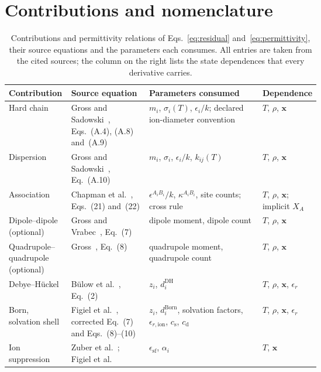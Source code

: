 \section{Contributions and nomenclature}
\begin{table}[pos=htbp]
\centering
\caption{Contributions and permittivity relations of Eqs.~\eqref{eq:residual} and~\eqref{eq:permittivity}, their source equations and the parameters each consumes. All entries are taken from the cited sources; the column on the right lists the state dependences that every derivative carries.}
\label{tab:contributions}
\small
\begin{tabularx}{\linewidth}{@{}>{\raggedright\arraybackslash}p{0.2\linewidth}>{\raggedright\arraybackslash}p{0.25\linewidth}>{\raggedright\arraybackslash}X>{\raggedright\arraybackslash}p{0.17\linewidth}@{}}
\toprule
Contribution & Source equation & Parameters consumed & Dependence \\
\midrule
Hard chain & Gross and Sadowski~\citep{Gross2001}, Eqs.~(A.4), (A.8) and~(A.9) & $m_i$, $\sigma_i(T)$, $\epsilon_i/k$; declared ion-diameter convention & $T$, $\rho$, $\mathbf{x}$ \\
Dispersion & Gross and Sadowski~\citep{Gross2001}, Eq.~(A.10) & $m_i$, $\sigma_i$, $\epsilon_i/k$, $k_{ij}(T)$ & $T$, $\rho$, $\mathbf{x}$ \\
Association & Chapman et al.~\citep{Chapman1990}, Eqs.~(21) and~(22) & $\epsilon^{A_iB_i}/k$, $\kappa^{A_iB_i}$, site counts; cross rule & $T$, $\rho$, $\mathbf{x}$; implicit $X_A$ \\
Dipole--dipole (optional) & Gross and Vrabec~\citep{Gross2006}, Eq.~(7) & dipole moment, dipole count & $T$, $\rho$, $\mathbf{x}$ \\
Quadrupole--quadrupole (optional) & Gross~\citep{grossEquationofstateContributionPolar2005}, Eq.~(8) & quadrupole moment, quadrupole count & $T$, $\rho$, $\mathbf{x}$ \\
Debye--H\"uckel & B\"ulow et al.~\citep{Bulow2019}, Eq.~(2) & $z_i$, $d_i^{\mathrm{DH}}$ & $T$, $\rho$, $\mathbf{x}$, $\epsilon_r$ \\
Born, solvation shell & Figiel et al.~\citep{Figiel2025,Figiel2026Correction}, corrected Eq.~(7) and Eqs.~(8)--(10) & $z_i$, $d_i^{\mathrm{Born}}$, solvation factors, $\epsilon_{r,\mathrm{ion}}$, $c_{\mathrm{s}}$, $c_{\mathrm{d}}$ & $T$, $\rho$, $\mathbf{x}$, $\epsilon_r$ \\
\midrule
Ion suppression & Zuber et al.~\citep{Zuber2014}; Figiel et al.~\citep{Figiel2025} & $\epsilon_{\mathrm{sf}}$, $\alpha_i$ & $T$, $\mathbf{x}$ \\

\end{tabularx}
\end{table}
